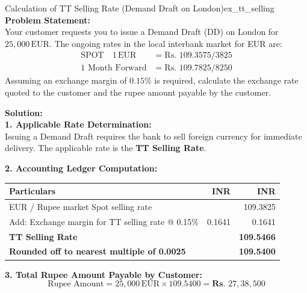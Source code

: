 \begin{example}{Calculation of TT Selling Rate (Demand Draft on London)}{ex_tt_selling}
\textbf{Problem Statement:}\\
Your customer requests you to issue a Demand Draft (DD) on London for $25,000\,\text{EUR}$. The ongoing rates in the local interbank market for EUR are:
\begin{align*}
    \text{SPOT} \quad 1\,\text{EUR} &= \text{Rs. } 109.3575 / 3825 \\
    \text{1 Month Forward} &= \text{Rs. } 109.7825 / 8250
\end{align*}
Assuming an exchange margin of $0.15\%$ is required, calculate the exchange rate quoted to the customer and the rupee amount payable by the customer.

\tcblower
\textbf{Solution:}\\
\noindent\textbf{1. Applicable Rate Determination:}\\
Issuing a Demand Draft requires the bank to sell foreign currency for immediate delivery. The applicable rate is the \textbf{TT Selling Rate}.

\noindent\textbf{2. Accounting Ledger Computation:}
\begin{center}
\small
\begin{tabularx}{\linewidth}{Xrr}
\toprule
\textbf{Particulars} & \textbf{INR} & \textbf{INR} \\
\midrule
EUR / Rupee market Spot selling rate & & 109.3825 \\
Add: Exchange margin for TT selling rate @ 0.15\% & 0.1641 & 0.1641 \\
\midrule
\textbf{TT Selling Rate} & & \textbf{109.5466} \\
\textbf{Rounded off to nearest multiple of 0.0025} & & \textbf{109.5400} \\
\bottomrule
\end{tabularx}
\end{center}

\noindent\textbf{3. Total Rupee Amount Payable by Customer:}
\begin{equation*}
    \text{Rupee Amount} = 25,000\,\text{EUR} \times 109.5400 = \textbf{Rs. } 27,38,500
\end{equation*}
\end{example}

